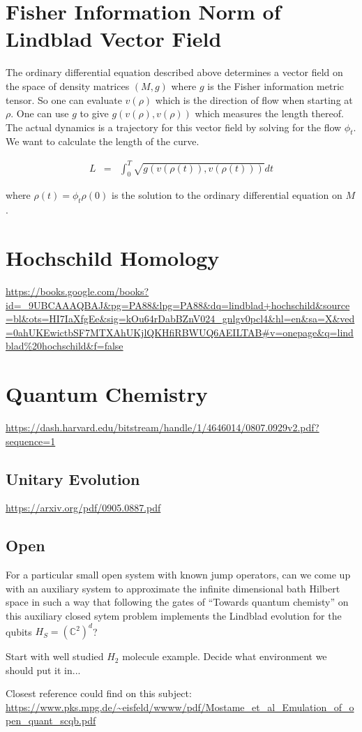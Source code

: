 \documentclass[11pt]{article}
\theoremstyle{change}
\theoremstyle{nonumberplain}
\numberwithin{equation}{section}
\begin{document}
\section{Fisher Information Norm of Lindblad Vector Field}

The ordinary differential equation described above determines a vector field on the space of density matrices $(M,g)$ where $g$ is the Fisher information metric tensor. So one can evaluate $v (\rho)$ which is the direction of flow when starting at $\rho$. One can use $g$ to give $g (v (\rho) , v(\rho) )$ which measures the length thereof. The actual dynamics is a trajectory for this vector field by solving for the flow $\phi_t$. We want to calculate the length of the curve.

\begin{eqnarray*}
L &=& \int_0^T \sqrt{g (v (\rho (t) ) , v(\rho (t) ) )} dt
\end{eqnarray*}

where $\rho (t) = \phi_t \rho (0)$ is the solution to the ordinary differential equation on $M$.

\section{Hochschild Homology}

\url{https://books.google.com/books?id=_9UBCAAAQBAJ&pg=PA88&lpg=PA88&dq=lindblad+hochschild&source=bl&ots=HI7IaXfgEe&sig=kOu64rDabBZnV024_gnlgv0pcl4&hl=en&sa=X&ved=0ahUKEwictbSF7MTXAhUKjlQKHfiRBWUQ6AEILTAB#v=onepage&q=lindblad\%20hochschild&f=false}

\section{Quantum Chemistry}

\url{https://dash.harvard.edu/bitstream/handle/1/4646014/0807.0929v2.pdf?sequence=1}

\subsection{Unitary Evolution}

\url{https://arxiv.org/pdf/0905.0887.pdf}

\subsection{Open}

For a particular small open system with known jump operators, can we come up with an auxiliary system to approximate the infinite dimensional bath Hilbert space in such a way that following the gates of ``Towards quantum chemisty'' on this auxiliary closed sytem problem implements the Lindblad evolution for the qubits $H_S = (\mathbb{C}^2)^d$?

Start with well studied $H_2$ molecule example. Decide what environment we should put it in...

Closest reference could find on this subject:
\url{https://www.pks.mpg.de/~eisfeld/wwww/pdf/Mostame_et_al_Emulation_of_open_quant_scqb.pdf}
\end{document}
